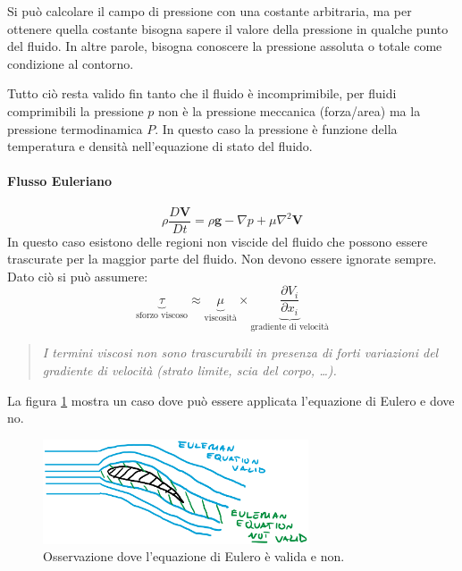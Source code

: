 Si può calcolare il campo di pressione con una costante arbitraria, ma per ottenere quella costante bisogna sapere il valore della pressione in qualche punto del fluido.
In altre parole, bisogna conoscere la pressione assoluta o totale come condizione al contorno.

Tutto ciò resta valido fin tanto che il fluido è incomprimibile, per fluidi comprimibili la pressione $p$ non è la pressione meccanica (forza/area) ma la pressione termodinamica $P$. In questo caso la pressione è funzione della temperatura e densità nell'equazione di stato del fluido.

\paragraph{Flusso Euleriano}
\begin{equation}
\rho \frac{D\mathbf{V}}{Dt} = \rho \mathbf{g} - \nabla p + \mu \nabla^2\mathbf{V}
\end{equation}
In questo caso esistono delle regioni non viscide del fluido che possono essere trascurate per la maggior parte del fluido. Non devono essere ignorate sempre.
Dato ciò si può assumere:
\begin{equation}
\underbrace{\tau}_{\text{sforzo viscoso}} \approx \underbrace{\mu}_{\text{viscosità}} \times \underbrace{\frac{\partial V_i}{\partial x_i}}_{\text{gradiente di velocità}}
\end{equation}
\begin{quote}
\textit{I termini viscosi non sono trascurabili in presenza di forti variazioni del gradiente di velocità (strato limite, scia del corpo, \dots).}
\end{quote}

La figura \ref{fig:EulerianEquation} mostra un caso dove può essere applicata l'equazione di Eulero e dove no.

\begin{figure}
\centering
\includegraphics[width = 0.7\textwidth]{gfx/EulerianEquation}
\caption{Osservazione dove l'equazione di Eulero è valida e non.}
\label{fig:EulerianEquation}
\end{figure}

